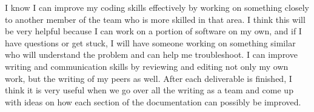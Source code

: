 \documentclass[12pt, titlepage]{article}
\begin{document}
\begin{enumerate}
\begin{enumerate}
    I know I can improve my coding skills effectively by working on something closely to another member of the team who is more skilled in that area. I think this will be very helpful because I can work on a portion of software on my own, and if I have questions or get stuck, I will have someone working on something similar who will understand the problem and can help me troubleshoot. 
    \noindent I can improve writing and communication skills by reviewing and editing not only my own work, but the writing of my peers as well. After each deliverable is finished, I think it is very useful when we go over all the writing as a team and come up with ideas on how each section of the documentation can possibly be improved.

  \end{enumerate}

\end{enumerate}
\end{document}
